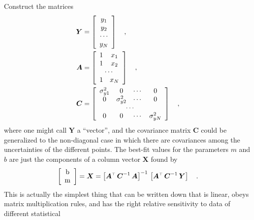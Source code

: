 \documentclass[12pt,twoside]{article}
\newcommand{\mmatrix}[1]{\boldsymbol{#1}}
\newcommand{\inverse}[1]{{#1}^{-1}}
\newcommand{\transpose}[1]{{#1}^{\scriptscriptstyle \top}}
\newcommand{\mA}{\mmatrix{A}}
\newcommand{\mAT}{\transpose{\mA}}
\newcommand{\mC}{\mmatrix{C}}
\newcommand{\mCinv}{\inverse{\mC}}
\newcommand{\mX}{\mmatrix{X}}
\newcommand{\mY}{\mmatrix{Y}}
\begin{document}
Construct the matrices
\begin{align}\label{eq:mY}
\mY &= \left[\begin{array}{c}
y_1 \\
y_2 \\
\cdots \\
y_N
\end{array}\right] \quad ,\\
\mA &= \left[\begin{array}{cc}
1 & x_1 \\
1 & x_2 \\
\multicolumn{2}{c}{\cdots} \\
1 & x_N
\end{array}\right] \quad ,\\
\mC & = \left[\begin{array}{cccc}
\sigma_{y1}^{2} & 0 & \cdots & 0 \\
0 & \sigma_{y2}^{2} & \cdots & 0 \\
\multicolumn{4}{c}{\cdots} \\
0 & 0 & \cdots & \sigma_{yN}^{2}
\end{array}\right] \quad ,\label{eq:covar}
\end{align}
where one might call $\mY$ a ``vector'', and the covariance matrix
$\mC$ could be generalized to the non-diagonal case in which there are
covariances among the uncertainties of the different points.  The
best-fit values for the parameters $m$ and $b$ are just the components
of a column vector $\mX$ found by
\begin{equation}\label{eq:lsf}
\left[\begin{array}{c} $b$ \\ $m$ \end{array}\right]
 = \mX = \inverse{\left[\mAT\,\mCinv\,\mA\right]}
  \,\left[\mAT\,\mCinv\,\mY\right] \quad .
\end{equation}
This is actually the simplest thing that can be written down that is
linear, obeys matrix multiplication rules, and has the right relative
sensitivity to data of different statistical
\end{document}
